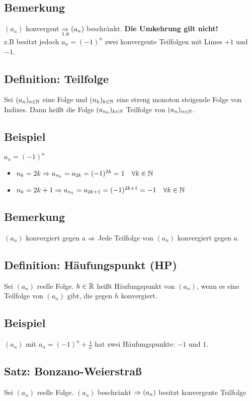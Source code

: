 \documentclass[10pt, a4paper, fleqn]{article}
\begin{document}
    \subsection{Bemerkung}
    $(a_n)$ konvergent $\underset{1.8}{\Rightarrow} (a_n)$ beschränkt.
    \textbf{Die Umkehrung gilt nicht!} \\
    z.B besitzt jedoch $a_n = (-1)^n$ zwei konvergente Teilfolgen mit Limes $+1$ und $-1$.

    \subsection{Definition: Teilfolge}
    Sei $(a_n)_{n \in \mathbb{N}}$ eine Folge und $(n_k)_{k \in \mathbb{N}}$ eine streng monoton steigende Folge
    von Indizes. Dann heißt die Folge $(a_{n_k})_{k \in \mathbb{N}}$ Teilfolge von $(a_n)_{n \in \mathbb{N}}$.

    \subsection{Beispiel}
    $a_n = (-1)^n$
    \begin{itemize}
        \item $n_k = 2k \Rightarrow a_{n_k} = a_{2k} = (-1)^{2k} = 1 \quad \forall k \in \mathbb{N}$
        \item $n_k = 2k + 1 \Rightarrow a_{n_k} = a_{2k + 1} = (-1)^{2k + 1} = -1 \quad \forall k \in \mathbb{N}$
    \end{itemize}

    \subsection{Bemerkung}
    $(a_n)$ konvergiert gegen $a$
    $\Rightarrow$ Jede Teilfolge von $(a_n)$ konvergiert gegen $a$.

    \subsection{Definition: Häufungspunkt (HP)}
    Sei $(a_n)$ reelle Folge. $h \in \mathbb{R}$ heißt Häufungspunkt von $(a_n)$, wenn es eine
    Teilfolge von $(a_n)$ gibt, die gegen $h$ konvergiert.

    \subsection{Beispiel}
    $(a_n)$ mit $a_n = (-1)^n + \frac{1}{n}$ hat zwei Häufungspunkte: $-1$ und $1$.

    \subsection{Satz: Bonzano-Weierstraß}
    Sei $(a_n)$ reelle Folge.
    $(a_n)$ beschränkt $\Rightarrow (a_n)$ besitzt konvergente Teilfolge
\end{document}
